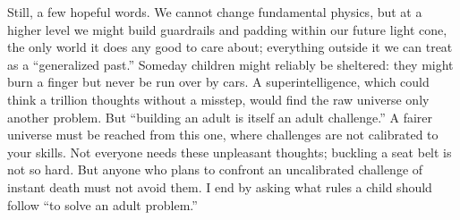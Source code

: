 Still, a few hopeful words. We cannot change fundamental physics, but at a higher level we might build guardrails and padding within our future light cone, the only world it does any good to care about; everything outside it we can treat as a ``generalized past.'' Someday children might reliably be sheltered: they might burn a finger but never be run over by cars. A superintelligence, which could think a trillion thoughts without a misstep, would find the raw universe only another problem. But ``building an adult is itself an adult challenge.'' A fairer universe must be reached from this one, where challenges are not calibrated to your skills. Not everyone needs these unpleasant thoughts; buckling a seat belt is not so hard. But anyone who plans to confront an uncalibrated challenge of instant death must not avoid them. I end by asking what rules a child should follow ``to solve an adult problem.''

